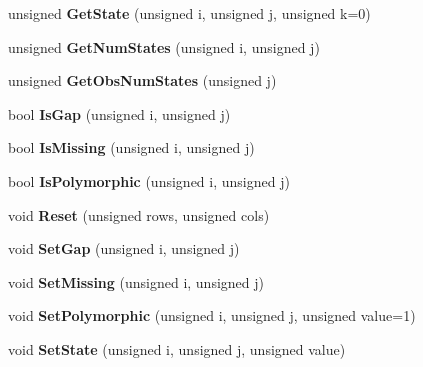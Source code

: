 \begin{DoxyCompactItemize}
\item 
\hypertarget{classNxsDiscreteMatrix_ada0b24e0f87ff41386c0947e51c340f1}{
unsigned {\bfseries GetState} (unsigned i, unsigned j, unsigned k=0)}
\label{classNxsDiscreteMatrix_ada0b24e0f87ff41386c0947e51c340f1}

\item 
\hypertarget{classNxsDiscreteMatrix_a5888814b520e5850ff6cf1ab11edc71d}{
unsigned {\bfseries GetNumStates} (unsigned i, unsigned j)}
\label{classNxsDiscreteMatrix_a5888814b520e5850ff6cf1ab11edc71d}

\item 
\hypertarget{classNxsDiscreteMatrix_a931d90b0bf6e031582b3d9c040e7ad6b}{
unsigned {\bfseries GetObsNumStates} (unsigned j)}
\label{classNxsDiscreteMatrix_a931d90b0bf6e031582b3d9c040e7ad6b}

\item 
\hypertarget{classNxsDiscreteMatrix_a1ff98ffcf216238b4dd43b74fe0f8941}{
bool {\bfseries IsGap} (unsigned i, unsigned j)}
\label{classNxsDiscreteMatrix_a1ff98ffcf216238b4dd43b74fe0f8941}

\item 
\hypertarget{classNxsDiscreteMatrix_a73adaad1c6b008aa44f2e4f181b6365a}{
bool {\bfseries IsMissing} (unsigned i, unsigned j)}
\label{classNxsDiscreteMatrix_a73adaad1c6b008aa44f2e4f181b6365a}

\item 
\hypertarget{classNxsDiscreteMatrix_a9614a45c41e6db08bd067999d26095a4}{
bool {\bfseries IsPolymorphic} (unsigned i, unsigned j)}
\label{classNxsDiscreteMatrix_a9614a45c41e6db08bd067999d26095a4}

\item 
\hypertarget{classNxsDiscreteMatrix_aa82127952da11e91b2c89b8937a52f64}{
void {\bfseries Reset} (unsigned rows, unsigned cols)}
\label{classNxsDiscreteMatrix_aa82127952da11e91b2c89b8937a52f64}

\item 
\hypertarget{classNxsDiscreteMatrix_a21162ff674ebeb3e2cb330ab0de6206e}{
void {\bfseries SetGap} (unsigned i, unsigned j)}
\label{classNxsDiscreteMatrix_a21162ff674ebeb3e2cb330ab0de6206e}

\item 
\hypertarget{classNxsDiscreteMatrix_a8afd5f10fb53529af048cd822fede5a9}{
void {\bfseries SetMissing} (unsigned i, unsigned j)}
\label{classNxsDiscreteMatrix_a8afd5f10fb53529af048cd822fede5a9}

\item 
\hypertarget{classNxsDiscreteMatrix_aef3c5167d49997c45c1913d1fd21bd11}{
void {\bfseries SetPolymorphic} (unsigned i, unsigned j, unsigned value=1)}
\label{classNxsDiscreteMatrix_aef3c5167d49997c45c1913d1fd21bd11}

\item 
\hypertarget{classNxsDiscreteMatrix_a7e7de3f9d25943e889917cbc989f2278}{
void {\bfseries SetState} (unsigned i, unsigned j, unsigned value)}
\label{classNxsDiscreteMatrix_a7e7de3f9d25943e889917cbc989f2278}

\end{DoxyCompactItemize}
